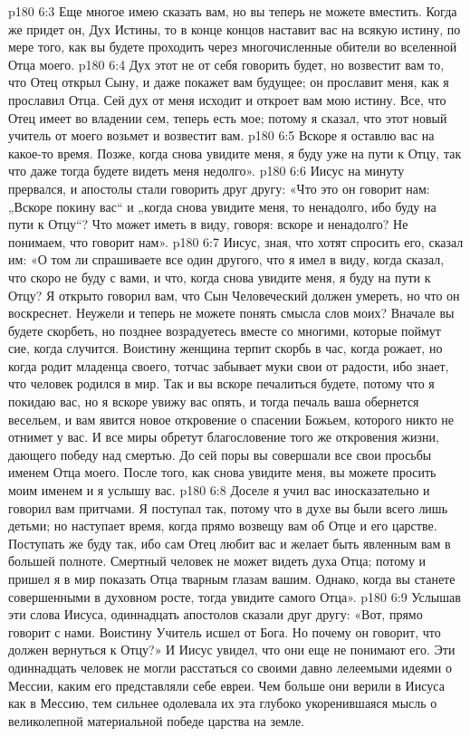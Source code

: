 \vs p180 6:3 Еще многое имею сказать вам, но вы теперь не можете вместить. Когда же придет он, Дух Истины, то в конце концов наставит вас на всякую истину, по мере того, как вы будете проходить через многочисленные обители во вселенной Отца моего.
\vs p180 6:4 Дух этот не от себя говорить будет, но возвестит вам то, что Отец открыл Сыну, и даже покажет вам будущее; он прославит меня, как я прославил Отца. Сей дух от меня исходит и откроет вам мою истину. Все, что Отец имеет во владении сем, теперь есть мое; потому я сказал, что этот новый учитель от моего возьмет и возвестит вам.
\vs p180 6:5 Вскоре я оставлю вас на какое\hyp{}то время. Позже, когда снова увидите меня, я буду уже на пути к Отцу, так что даже тогда будете видеть меня недолго».
\vs p180 6:6 Иисус на минуту прервался, и апостолы стали говорить друг другу: «Что это он говорит нам: „Вскоре покину вас“ и „когда снова увидите меня, то ненадолго, ибо буду на пути к Отцу“? Что может иметь в виду, говоря: вскоре и ненадолго? Не понимаем, что говорит нам».
\vs p180 6:7 Иисус, зная, что хотят спросить его, сказал им: «О том ли спрашиваете все один другого, что я имел в виду, когда сказал, что скоро не буду с вами, и что, когда снова увидите меня, я буду на пути к Отцу? Я открыто говорил вам, что Сын Человеческий должен умереть, но что он воскреснет. Неужели и теперь не можете понять смысла слов моих? Вначале вы будете скорбеть, но позднее возрадуетесь вместе со многими, которые поймут сие, когда случится. Воистину женщина терпит скорбь в час, когда рожает, но когда родит младенца своего, тотчас забывает муки свои от радости, ибо знает, что человек родился в мир. Так и вы вскоре печалиться будете, потому что я покидаю вас, но я вскоре увижу вас опять, и тогда печаль ваша обернется весельем, и вам явится новое откровение о спасении Божьем, которого никто не отнимет у вас. И все миры обретут благословение того же откровения жизни, дающего победу над смертью. До сей поры вы совершали все свои просьбы именем Отца моего. После того, как снова увидите меня, вы можете просить моим именем и я услышу вас.
\vs p180 6:8 Доселе я учил вас иносказательно и говорил вам притчами. Я поступал так, потому что в духе вы были всего лишь детьми; но наступает время, когда прямо возвещу вам об Отце и его царстве. Поступать же буду так, ибо сам Отец любит вас и желает быть явленным вам в большей полноте. Смертный человек не может видеть духа Отца; потому и пришел я в мир показать Отца тварным глазам вашим. Однако, когда вы станете совершенными в духовном росте, тогда увидите самого Отца».
\vs p180 6:9 Услышав эти слова Иисуса, одиннадцать апостолов сказали друг другу: «Вот, прямо говорит с нами. Воистину Учитель исшел от Бога. Но почему он говорит, что должен вернуться к Отцу?» И Иисус увидел, что они еще не понимают его. Эти одиннадцать человек не могли расстаться со своими давно лелеемыми идеями о Мессии, каким его представляли себе евреи. Чем больше они верили в Иисуса как в Мессию, тем сильнее одолевала их эта глубоко укоренившаяся мысль о великолепной материальной победе царства на земле.
